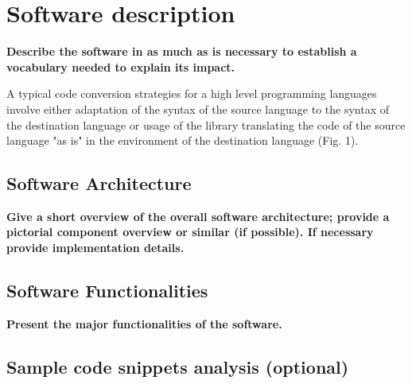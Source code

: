\section{Software description}
\label{} 

\textbf{Describe the software in as much as is necessary to establish a vocabulary needed to explain its impact. }

A typical code conversion strategies for a high level programming languages involve either adaptation of the syntax of the source language to the syntax of the destination language or usage of the library translating the code of the source language "as is" in the environment of the destination language (Fig. 1).

\subsection{Software Architecture}
\label{} 

\textbf{Give a short overview of the overall software architecture; provide a pictorial component overview or similar (if possible). If necessary provide implementation details.}


\subsection{Software Functionalities}
\label{} 

\textbf{Present the major functionalities of the software.}


\subsection{Sample code snippets analysis (optional)}
\label{} 
  
  
  